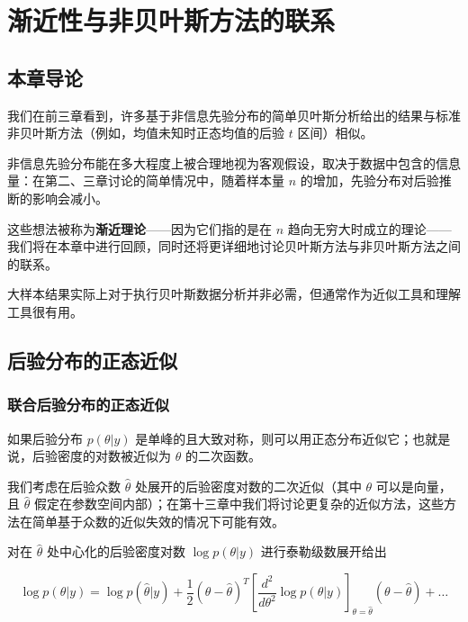 
\chapter{渐近性与非贝叶斯方法的联系}

\section{本章导论}

我们在前三章看到，许多基于非信息先验分布的简单贝叶斯分析给出的结果与标准非贝叶斯方法（例如，均值未知时正态均值的后验 $t$ 区间）相似。

非信息先验分布能在多大程度上被合理地视为客观假设，取决于数据中包含的信息量：在第二、三章讨论的简单情况中，随着样本量 $n$ 的增加，先验分布对后验推断的影响会减小。

这些想法被称为\textbf{渐近理论}——因为它们指的是在 $n$ 趋向无穷大时成立的理论——我们将在本章中进行回顾，同时还将更详细地讨论贝叶斯方法与非贝叶斯方法之间的联系。

大样本结果实际上对于执行贝叶斯数据分析并非必需，但通常作为近似工具和理解工具很有用。

\section{后验分布的正态近似}\label{sec:ch4-normal-approx}

\subsection{联合后验分布的正态近似}

如果后验分布 $p(\theta | y)$ 是单峰的且大致对称，则可以用正态分布近似它；也就是说，后验密度的对数被近似为 $\theta$ 的二次函数。

我们考虑在后验众数 $\hat{\theta}$ 处展开的后验密度对数的二次近似（其中 $\theta$ 可以是向量，且 $\hat{\theta}$ 假定在参数空间内部）；在第十三章中我们将讨论更复杂的近似方法，这些方法在简单基于众数的近似失效的情况下可能有效。

对在 $\hat{\theta}$ 处中心化的后验密度对数 $\log p(\theta | y)$ 进行泰勒级数展开给出

\[
\log p(\theta | y) = \log p(\hat{\theta} | y) + \frac{1}{2}(\theta - \hat{\theta})^T \left[ \frac{d^2}{d\theta^2} \log p(\theta | y) \right]_{\theta = \hat{\theta}} (\theta - \hat{\theta}) + \dots \label{eq:laplace-approx-taylor}
\]

